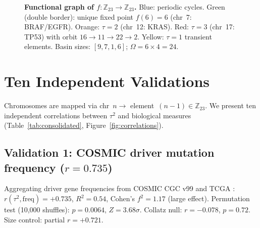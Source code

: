 \documentclass[11pt,a4paper]{article}
\begin{document}
\begin{figure}[h]
\caption{\textbf{Functional graph of $f: \mathbb{Z}_{23} \to \mathbb{Z}_{23}$.} Blue: periodic cycles. Green (double border): unique fixed point $f(6) = 6$ (chr~7: BRAF/EGFR). Orange: $\tau = 2$ (chr~12: KRAS). Red: $\tau = 3$ (chr~17: TP53) with orbit $16 \to 11 \to 22 \to 2$. Yellow: $\tau = 1$ transient elements. Basin sizes: $[9, 7, 1, 6]$; $\Omega = 6 \times 4 = 24$.}
\label{fig:functional_graph}
\end{figure}

\section{Ten Independent Validations}

Chromosomes are mapped via chr~$n \to$ element~$(n{-}1) \in \mathbb{Z}_{23}$. We present ten independent correlations between $\tau^2$ and biological measures (Table~\ref{tab:consolidated}, Figure~\ref{fig:correlations}).

\subsection{Validation 1: COSMIC driver mutation frequency ($r = 0.735$)}

Aggregating driver gene frequencies from COSMIC CGC v99 \citep{Sondka2018} and TCGA \citep{Bailey2018}: $r(\tau^2, \text{freq}) = +0.735$, $R^2 = 0.54$, Cohen's $f^2 = 1.17$ (large effect). Permutation test (10,000 shuffles): $p = 0.0064$, $Z = 3.68\sigma$. Collatz null: $r = -0.078$, $p = 0.72$. Size control: partial $r = +0.721$.
\end{document}
